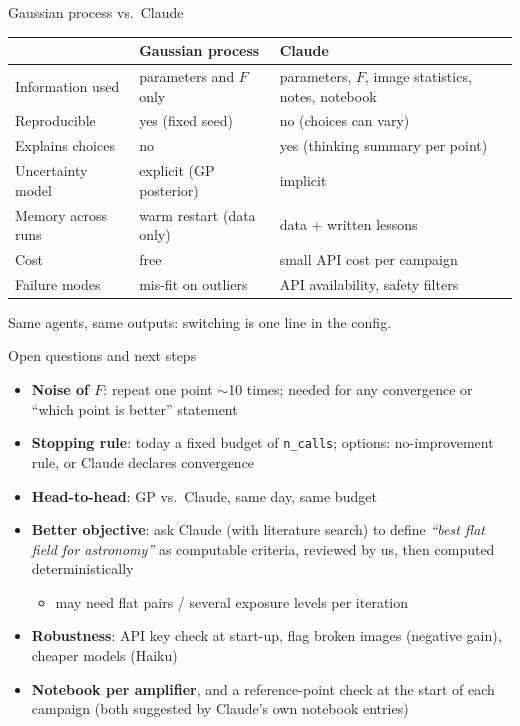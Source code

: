 \documentclass[aspectratio=169,10pt]{beamer}
\begin{document}
\begin{frame}{Gaussian process vs.\ Claude}
  \small
  \begin{tabular}{p{}p{}p{}}
    \toprule
    & Gaussian process & Claude \\
    \midrule
    Information used & parameters and $F$ only & parameters, $F$, image statistics, notes, notebook \\
    Reproducible & yes (fixed seed) & no (choices can vary) \\
    Explains choices & no & yes (thinking summary per point) \\
    Uncertainty model & explicit (GP posterior) & implicit \\
    Memory across runs & warm restart (data only) & data + written lessons \\
    Cost & free & small API cost per campaign \\
    Failure modes & mis-fit on outliers & API availability, safety filters \\
    \bottomrule
  \end{tabular}

  \vspace{3mm}
  Same agents, same outputs: switching is one line in the config.
\end{frame}

\begin{frame}{Open questions and next steps}
  \begin{itemize}
    \item \textbf{Noise of $F$}: repeat one point $\sim$10 times; needed for any
          convergence or ``which point is better'' statement
    \item \textbf{Stopping rule}: today a fixed budget of \texttt{n\_calls};
          options: no-improvement rule, or Claude declares convergence
    \item \textbf{Head-to-head}: GP vs.\ Claude, same day, same budget
    \item \textbf{Better objective}: ask Claude (with literature search) to
          define \emph{``best flat field for astronomy''} as computable criteria,
          reviewed by us, then computed deterministically
          \begin{itemize}\scriptsize
            \item may need flat pairs / several exposure levels per iteration
          \end{itemize}
    \item \textbf{Robustness}: API key check at start-up, flag broken images
          (negative gain), cheaper models (Haiku)
    \item \textbf{Notebook per amplifier}, and a reference-point check at the start of
          each campaign (both suggested by Claude's own notebook entries)
  \end{itemize}
\end{frame}
\end{document}
